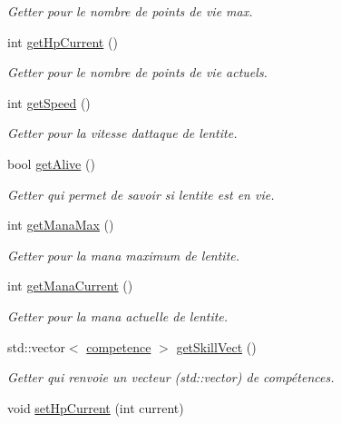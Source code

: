 \begin{DoxyCompactItemize}
\begin{DoxyCompactList}\small\item\em Getter pour le nombre de points de vie max. \end{DoxyCompactList}\item 
int \hyperlink{classentite_ae41fa12581d2f94d5f6ae67fec4e56e9}{get\+Hp\+Current} ()
\begin{DoxyCompactList}\small\item\em Getter pour le nombre de points de vie actuels. \end{DoxyCompactList}\item 
int \hyperlink{classentite_ab97281eadee20e03fe497396439260c9}{get\+Speed} ()
\begin{DoxyCompactList}\small\item\em Getter pour la vitesse d\textquotesingle{}attaque de l\textquotesingle{}entite. \end{DoxyCompactList}\item 
bool \hyperlink{classentite_a5a39811eb0c12ae85a23f152c8ba6d58}{get\+Alive} ()
\begin{DoxyCompactList}\small\item\em Getter qui permet de savoir si l\textquotesingle{}entite est en vie. \end{DoxyCompactList}\item 
int \hyperlink{classentite_a427218420d74bdec1f79f93572ecf24a}{get\+Mana\+Max} ()
\begin{DoxyCompactList}\small\item\em Getter pour la mana maximum de l\textquotesingle{}entite. \end{DoxyCompactList}\item 
int \hyperlink{classentite_ad3e7a419d79d7d7e836243c4920703e3}{get\+Mana\+Current} ()
\begin{DoxyCompactList}\small\item\em Getter pour la mana actuelle de l\textquotesingle{}entite. \end{DoxyCompactList}\item 
std\+::vector$<$ \hyperlink{classcompetence}{competence} $>$ \hyperlink{classentite_a90c927665d7c0b7d6d5202604887e1e2}{get\+Skill\+Vect} ()
\begin{DoxyCompactList}\small\item\em Getter qui renvoie un vecteur (std\+::vector) de compétences. \end{DoxyCompactList}\item 
void \hyperlink{classentite_af775cfe5a1c47e62b7834ef9e4728b66}{set\+Hp\+Current} (int current)

\end{DoxyCompactItemize}
